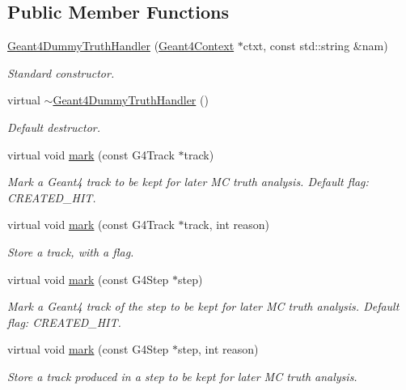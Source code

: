 \subsection*{Public Member Functions}
\begin{DoxyCompactItemize}
\item 
\hyperlink{class_d_d4hep_1_1_simulation_1_1_geant4_dummy_truth_handler_a5c401a9e0de83670c8e61da169bdd56e}{Geant4DummyTruthHandler} (\hyperlink{class_d_d4hep_1_1_simulation_1_1_geant4_context}{Geant4Context} $\ast$ctxt, const std::string \&nam)
\begin{DoxyCompactList}\small\item\em Standard constructor. \item\end{DoxyCompactList}\item 
virtual \hyperlink{class_d_d4hep_1_1_simulation_1_1_geant4_dummy_truth_handler_ae5c0fe10becfd6ba266b4bbb1b56c253}{$\sim$Geant4DummyTruthHandler} ()
\begin{DoxyCompactList}\small\item\em Default destructor. \item\end{DoxyCompactList}\item 
virtual void \hyperlink{class_d_d4hep_1_1_simulation_1_1_geant4_dummy_truth_handler_ae7540d20113834f5a31134df344813ad}{mark} (const G4Track $\ast$track)
\begin{DoxyCompactList}\small\item\em Mark a Geant4 track to be kept for later MC truth analysis. Default flag: CREATED\_\-HIT. \item\end{DoxyCompactList}\item 
virtual void \hyperlink{class_d_d4hep_1_1_simulation_1_1_geant4_dummy_truth_handler_aa5a1b21c7557cd4dfb314b217fc37a87}{mark} (const G4Track $\ast$track, int reason)
\begin{DoxyCompactList}\small\item\em Store a track, with a flag. \item\end{DoxyCompactList}\item 
virtual void \hyperlink{class_d_d4hep_1_1_simulation_1_1_geant4_dummy_truth_handler_a19f10fada0444ae5f60deb1d92761969}{mark} (const G4Step $\ast$step)
\begin{DoxyCompactList}\small\item\em Mark a Geant4 track of the step to be kept for later MC truth analysis. Default flag: CREATED\_\-HIT. \item\end{DoxyCompactList}\item 
virtual void \hyperlink{class_d_d4hep_1_1_simulation_1_1_geant4_dummy_truth_handler_a0387d2cf651a83c45242962f80c41096}{mark} (const G4Step $\ast$step, int reason)
\begin{DoxyCompactList}\small\item\em Store a track produced in a step to be kept for later MC truth analysis. \item\end{DoxyCompactList}\end{DoxyCompactItemize}


